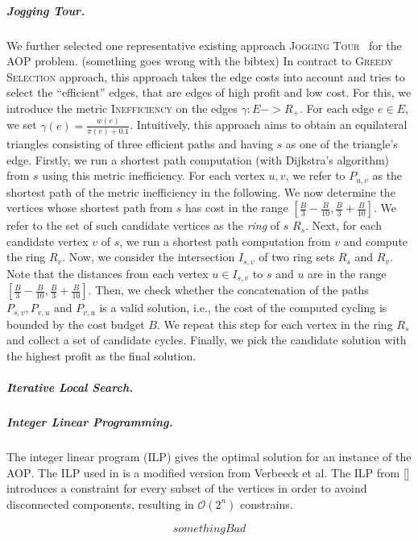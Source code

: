 \documentclass[sigconf,natbib=false]{acmart}
\newcommand{\greedy}{\textsc{Greedy Selection}\xspace}
\newcommand{\jogging}{\textsc{Jogging Tour}\xspace}
\newcommand{\AOP}{\textsc{AOP}\xspace}
\begin{document}
\subparagraph*{\textbf{Jogging Tour.}}
We further selected one representative existing approach \jogging~\cite{DBLP:conf/wea/GemsaPWZ13} for the \AOP problem.  (something goes wrong with the bibtex)
In contract to \greedy approach, this approach takes the edge costs into account and  tries to select the ``efficient'' edges, that are edges of high profit and low cost. 
For this, we introduce the metric \textsc{Inefficiency} \xspace on the edges $\gamma: E-> R_{+}$. For each edge $e \in E$, we set $\gamma(e) = \frac{w(e)}{\pi(e) + 0.1}$.
Intuitively, this approach aims to obtain an equilateral triangles consisting of three efficient paths and having $s$ as one of the triangle's edge. Firstly, we run a shortest path computation (with Dijkstra’s algorithm) from $s$
using this metric inefficiency.
For each vertex $u,v$, we refer to $P_{u,v}$ as the shortest path of the metric inefficiency in the following.   
We now determine the vertices whose shortest path from $s$ has cost in the range $[\frac{B}{3}- \frac{B}{10} , \frac{B}{3} + \frac{B}{10}]$. We refer to the set of such candidate vertices as the \textit{ring} of $s$ $R_s$.
Next, for each candidate vertex $v$ of $s$, we run a shortest path computation from $v$ and compute the ring $R_v$. Now, we consider the intersection $I_{s,v}$ of two ring sets $R_s$ and $R_v$. Note that the distances from each vertex $u\in I_{s,v}$ to $s$ and $u$ are in the range $[\frac{B}{3}- \frac{B}{10} , \frac{B}{3} + \frac{B}{10}]$. Then, we check whether the concatenation of the paths $P_{s,v}, P_{v,u}$ and $P_{v,u}$ is a valid solution, i.e., the cost of the computed cycling is bounded by the cost budget $B$. 
We repeat this step for each vertex in the ring $R_s$ and collect a set of candidate cycles. 
Finally, we pick the candidate solution with the highest profit as the final solution.
       

\subparagraph*{\textbf{Iterative Local Search.}}

\subparagraph*{\textbf{Integer Linear Programming.}}
The integer linear program (ILP) gives the optimal solution for an instance of the \AOP. The ILP used in \tG is a modified version from Verbeeck et al. 
The ILP from [] introduces a constraint for every subset of the vertices in order to avoind disconnected components, resulting in $\mathcal{O}(2^n)$ constrains.

\begin{equation}
  something Bad
  \label{exponential_ILP}
\end{equation}
\end{document}
